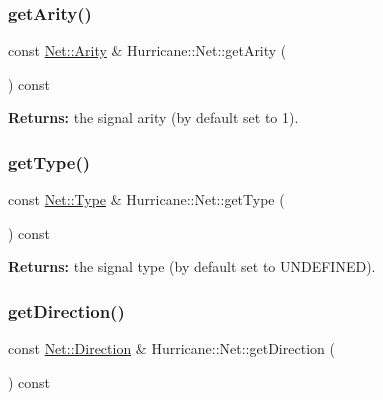 \mbox{\label{classHurricane_1_1Net_a78de2202fcf4f16024b4460ebb7dc907}} 
\subsubsection{\texorpdfstring{get\+Arity()}{getArity()}}
{\footnotesize\ttfamily const \hyperlink{classHurricane_1_1Net_a3a242d929e0c733f90f3f69be8cc427b}{Net\+::\+Arity} \& Hurricane\+::\+Net\+::get\+Arity (\begin{DoxyParamCaption}{ }\end{DoxyParamCaption}) const\hspace{0.3cm}{\ttfamily [inline]}}

{\bfseries Returns\+:} the signal arity (by default set to 1). \mbox{\label{classHurricane_1_1Net_a0fa61dc0ccb67f384f03b35f83d391e7}} 
\subsubsection{\texorpdfstring{get\+Type()}{getType()}}
{\footnotesize\ttfamily const \hyperlink{classHurricane_1_1Net_1_1Type}{Net\+::\+Type} \& Hurricane\+::\+Net\+::get\+Type (\begin{DoxyParamCaption}{ }\end{DoxyParamCaption}) const\hspace{0.3cm}{\ttfamily [inline]}}

{\bfseries Returns\+:} the signal type (by default set to U\+N\+D\+E\+F\+I\+N\+ED). \mbox{\label{classHurricane_1_1Net_aa84245d734dfaa572660a1a2c1bfc56e}} 
\subsubsection{\texorpdfstring{get\+Direction()}{getDirection()}}
{\footnotesize\ttfamily const \hyperlink{classHurricane_1_1Net_1_1Direction}{Net\+::\+Direction} \& Hurricane\+::\+Net\+::get\+Direction (\begin{DoxyParamCaption}{ }\end{DoxyParamCaption}) const\hspace{0.3cm}{\ttfamily [inline]}}

